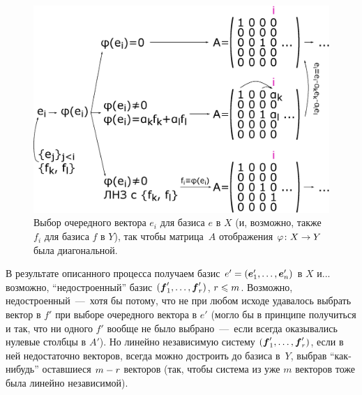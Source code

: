 \documentclass[a4paper,12pt]{article}
\begin{document}
  \begin{figure}[h]
    \centering
  
    \includegraphics[width=0.9\columnwidth]{map-x-y-diag-scheme}
  
    \caption{Выбор очередного вектора $e_i$ для базиса $e$ в $X$ (и, возможно, также $f_i$ для базиса $f$ в $Y$), так чтобы матрица~$A$ отображения $\phi\colon X \hm\to Y$ была диагональной.}
    \label{fig:map-x-y-diag-scheme}
  \end{figure}
  
  В результате описанного процесса получаем базис $e' \hm= (\bds e_1', \ldots, \bds e_n')$ в $X$ и... возможно, ``недостроенный'' базис $(\boldsymbol f_1', \ldots, \boldsymbol f_r')$, $r \hm\leq m$.
  Возможно, недостроенный~---~хотя бы потому, что не при любом исходе удавалось выбрать вектор в $f'$ при выборе очередного вектора в $e'$ (могло бы в принципе получиться и так, что ни одного $f'$ вообще не было выбрано~---~если всегда оказывались нулевые столбцы в $A'$).
  Но линейно независимую систему $(\boldsymbol f_1', \ldots, \boldsymbol f_r')$, если в ней недостаточно векторов, всегда можно достроить до базиса в~$Y$, выбрав ``как-нибудь'' оставшиеся $m \hm- r$ векторов (так, чтобы система из уже $m$ векторов тоже была линейно независимой).
  
\end{document}
